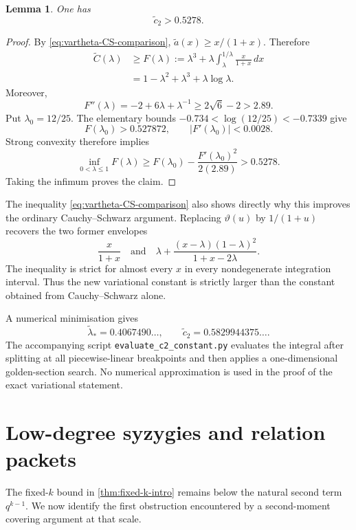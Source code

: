 \documentclass[11pt,reqno]{amsart}
\numberwithin{equation}{section}
\newtheorem{lemma}[lemma]{Lemma}
\theoremstyle{definition}
\theoremstyle{remark}
\newcommand{\cC}{\mathcal C}
\newcommand{\abs}[1]{\lvert#1\rvert}
\def\mathcal#1{#1}%
\begin{document}
\begin{lemma}\label{lem:c2tilde-rigorous-lower}
One has
\begin{equation}\label{eq:c2tilde-rigorous-lower}
 \widetilde c_2>0.5278.
\end{equation}
\end{lemma}

\begin{proof}
By \eqref{eq:vartheta-CS-comparison},
$\widetilde a(x)\ge x/(1+x)$.  Therefore
\begin{align*}
 \widetilde{\cC}(\lambda)
 &\ge F(\lambda)
 :=\lambda^3+
 \lambda\int_\lambda^{1/\lambda}\frac{x}{1+x}\,dx\\
 &=1-\lambda^2+\lambda^3+\lambda\log\lambda.
\end{align*}
Moreover,
\[
 F''(\lambda)=-2+6\lambda+\lambda^{-1}
 \ge2\sqrt6-2>2.89.
\]
Put $\lambda_0=12/25$.  The elementary bounds
$-0.734<\log(12/25)<-0.7339$ give
\[
 F(\lambda_0)>0.527872,
 \qquad
 \abs{F'(\lambda_0)}<0.0028.
\]
Strong convexity therefore implies
\[
 \inf_{0<\lambda\le1}F(\lambda)
 \ge
 F(\lambda_0)-
 \frac{F'(\lambda_0)^2}{2(2.89)}
 >0.5278.
\]
Taking the infimum proves the claim.
\end{proof}

The inequality \eqref{eq:vartheta-CS-comparison} also shows directly why this improves the ordinary Cauchy--Schwarz argument.  Replacing $\vartheta(u)$ by $1/(1+u)$ recovers the two former envelopes
\[
 \frac{x}{1+x}
 \quad\text{and}\quad
 \lambda+
 \frac{(x-\lambda)(1-\lambda)^2}{1+x-2\lambda}.
\]
The inequality is strict for almost every $x$ in every nondegenerate integration interval.  Thus the new variational constant is strictly larger than the constant obtained from Cauchy--Schwarz alone.

A numerical minimisation gives
\[
 \widetilde\lambda_*=0.4067490\ldots,
 \qquad
 \widetilde c_2=0.5829944375\ldots.
\]
The accompanying script \texttt{evaluate\_c2\_constant.py} evaluates the integral after splitting at all piecewise-linear breakpoints and then applies a one-dimensional golden-section search.  No numerical approximation is used in the proof of the exact variational statement.


\section{Low-degree syzygies and relation packets}\label{sec:packets}

The fixed-$k$ bound in \cref{thm:fixed-k-intro} remains below the natural second term $q^{k-1}$.  We now identify the first obstruction encountered by a second-moment covering argument at that scale.
\end{document}
